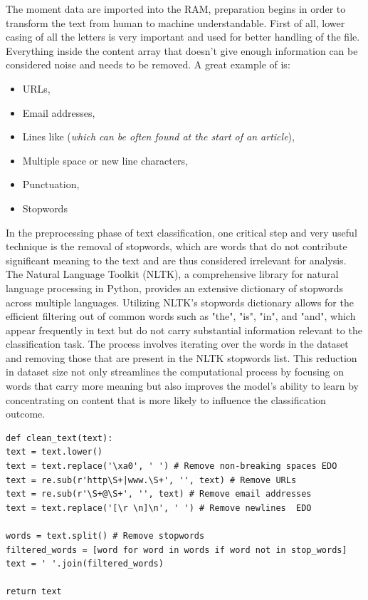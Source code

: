 The moment data are imported into the RAM, preparation begins in order to transform the text from human to machine understandable. 
First of all, lower casing of all the letters is very important and used for better handling of the file.
Everything inside the content array that doesn't give enough information can be considered noise and needs to be removed.
A great example of  is:
\begin{itemize}
	\item URLs,
	\item Email addresses,
	\item Lines like  (\textit{which can be often found at the start of an article}),
	\item Multiple space or new line characters,
	\item Punctuation,
	\item Stopwords
\end{itemize}  

In the preprocessing phase of text classification, one critical step and very useful technique is the removal of stopwords, which are words that do not contribute significant meaning to the text and are thus considered irrelevant for analysis.
The Natural Language Toolkit (NLTK), a comprehensive library for natural language processing in Python, provides an extensive dictionary of stopwords across multiple languages. Utilizing NLTK's stopwords dictionary allows for the efficient filtering out of common words such as "the", "is", "in", and "and", which appear frequently in text but do not carry substantial information relevant to the classification task.
The process involves iterating over the words in the dataset and removing those that are present in the NLTK stopwords list.
This reduction in dataset size not only streamlines the computational process by focusing on words that carry more meaning but also improves the model's ability to learn by concentrating on content that is more likely to influence the classification outcome.\\

\begin{lstlisting}
def clean_text(text):
text = text.lower()
text = text.replace('\xa0', ' ') # Remove non-breaking spaces EDO
text = re.sub(r'http\S+|www.\S+', '', text) # Remove URLs
text = re.sub(r'\S+@\S+', '', text) # Remove email addresses
text = text.replace('[\r \n]\n', ' ') # Remove newlines  EDO

words = text.split() # Remove stopwords
filtered_words = [word for word in words if word not in stop_words]
text = ' '.join(filtered_words)

return text
\end{lstlisting}

